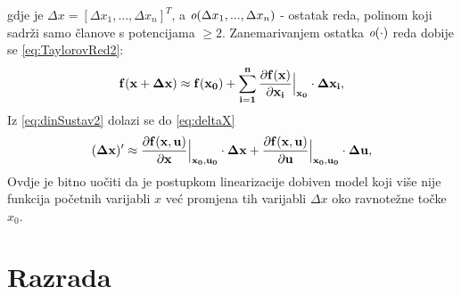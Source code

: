 \documentclass[times, utf8, diplomski]{fer}
\begin{document}
gdje je $\Delta x = [\Delta x_1,...,\Delta x_n]^T$, a $\emph{o}(\Delta x_1,...,\Delta x_n)$ - ostatak reda, polinom koji sadrži samo članove s potencijama $\geq 2$.
Zanemarivanjem ostatka $\emph{o}(\cdot)$ reda dobije se \ref{eq:TaylorovRed2}:
\begin{equation}
\centering
	\mathbf{f(x+\Delta x) \approx f(x_0)+\sum_{i=1}^{n}{\frac{\partial f(x)}{\partial x_i}}\Big|_{x_0}\cdot\Delta x_i},
\label{eq:TaylorovRed2}
\end{equation}
Iz \ref{eq:dinSustav2} dolazi se do \ref{eq:deltaX}
\begin{equation}
\centering
	\mathbf{(\Delta x)' \approx {\frac{\partial f(x,u)}{\partial x}}\Big|_{x_0,u_0}\cdot\Delta x+ {\frac{\partial f(x,u)}{\partial u}}\Big|_{x_0,u_0}\cdot\Delta u},
\label{eq:deltaX}
\end{equation}
Ovdje je bitno uočiti da je postupkom linearizacije dobiven model koji više nije funkcija početnih varijabli $x$ već promjena tih varijabli $\Delta x$ oko ravnotežne točke $x_0$. \citep{AUzbirka}



\chapter{Razrada}
\end{document}
